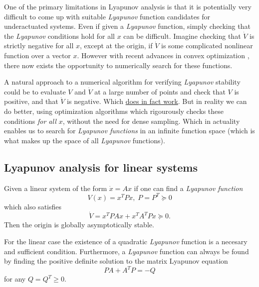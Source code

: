 One of the primary limitations in Lyapunov analysis is that it is potentially
very difficult to come up with suitable \textit{Lyapunov} function candidates
for underactuated systems. Even if given a \textit{Lyapunov} function, simply
checking that the \textit{Lyapunov} conditions hold for all \(x\) can be
difficult. Imagine checking that \(\dot{V}\) is strictly negative for all \(x\),
except at the origin, if \(\dot{V}\) is some complicated nonlinear function over
a vector \(x\). However with recent advances in convex optimization
\cite{parilloStructuredSemidefinitePrograms}, there now exists the opportunity
to numerically search for these functions.

A natural approach to a numerical algorithm for verifying \textit{Lyapunov}
stability could be to evaluate \(V\) and \(\dot{V}\) at a large number of points
and check that \(V\) is positive, and that \(\dot{V}\) is negative. Which
\href{https://github.com/RobotLocomotion/drake/blob/master/systems/analysis/test/lyapunov_test.cc}{does
  in fact work}. But in reality we can do better, using optimization algorithms
which rigourously checks these conditions \textit{for all \(x\)}, without the
need for dense sampling. Which in actuality enables us to search for
\textit{Lyapunov functions} in an infinite function space (which is what makes
up the space of all \textit{Lyapunov} functions).

\subsection{Lyapunov analysis for linear systems}
\label{subsec:Lyapunov analysis for linear systems}

\begin{theorem}
  Given a linear system of the form \(\dot{x} = Ax\) if one can find a
  \textit{Lyapunov function}
  \[
    V(x) = x^TPx, \; P = P^T \succeq 0
  \]
  which also satisfies
  \[
    \dot{V} = x^TPAx + x^TA^TPx \succeq 0.
  \]
  Then the origin is globally asymptotically stable.
\end{theorem} \cite{tedrakeUnderactuatedRoboticsAlgorithms2019}

For the linear case the existence of a quadratic \textit{Lyapunov} function is a
necesary and sufficient condition. Furthermore, a \textit{Lyapunov} function can
always be found by finding the positive definite solution to the matrix Lyapunov
equation
\begin{equation}
  \label{eqn:linearlyapunov}
  PA + A^TP = -Q
\end{equation}
for any \(Q = Q^T \geqslant 0\).

